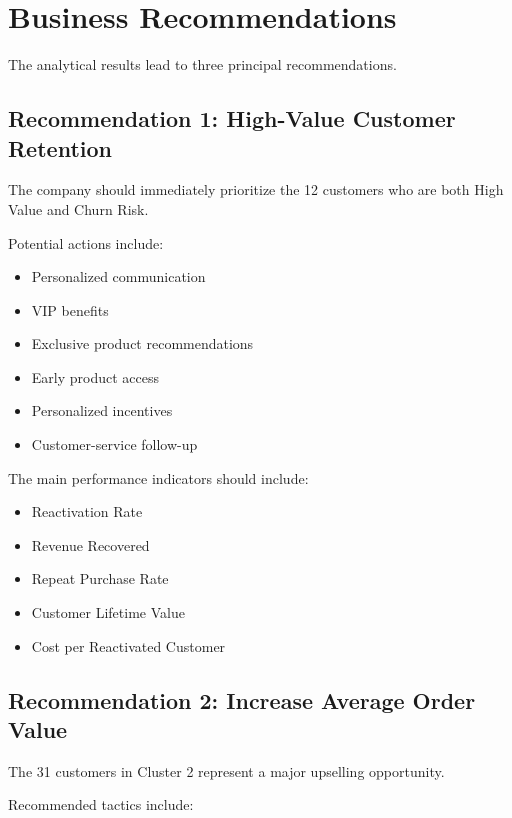 \documentclass[11pt,a4paper]{article}
\begin{document}

\section{Business Recommendations}

The analytical results lead to three principal recommendations.

\subsection{Recommendation 1: High-Value Customer Retention}

The company should immediately prioritize the 12 customers who are both High Value and Churn Risk.

Potential actions include:

\begin{itemize}
    \item Personalized communication
    \item VIP benefits
    \item Exclusive product recommendations
    \item Early product access
    \item Personalized incentives
    \item Customer-service follow-up
\end{itemize}

The main performance indicators should include:

\begin{itemize}
    \item Reactivation Rate
    \item Revenue Recovered
    \item Repeat Purchase Rate
    \item Customer Lifetime Value
    \item Cost per Reactivated Customer
\end{itemize}

\subsection{Recommendation 2: Increase Average Order Value}

The 31 customers in Cluster 2 represent a major upselling opportunity.

Recommended tactics include:
\end{document}
